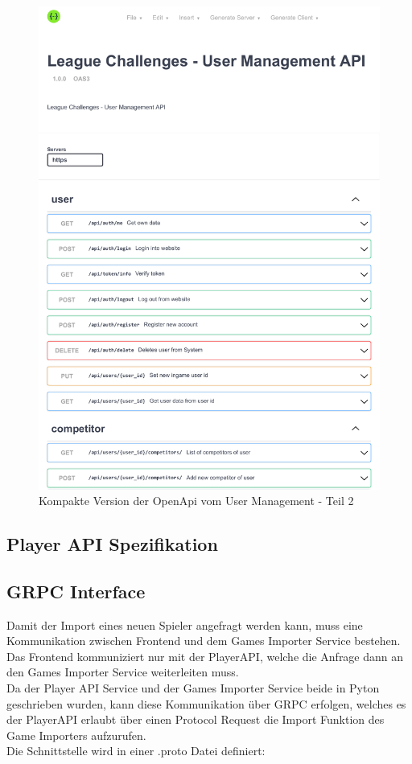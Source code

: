 \begin{figure}
  \centering
  \includegraphics[width=1\textwidth, page=2]{images/pdfs/openapi-short.pdf}
  \caption{Kompakte Version der OpenApi vom User Management - Teil 2}
  \label{fig:compact_user_openapi_2}
\end{figure}

\subsection{Player API Spezifikation}

\subsection{GRPC Interface}
Damit der Import eines neuen Spieler angefragt werden kann, muss eine Kommunikation zwischen Frontend und dem Games Importer Service bestehen. Das Frontend kommuniziert nur mit der PlayerAPI, welche die Anfrage dann an den Games Importer Service weiterleiten muss.\\
Da der Player API Service und der Games Importer Service beide in Pyton geschrieben wurden, kann diese Kommunikation über GRPC erfolgen, welches es der PlayerAPI erlaubt über einen Protocol Request die Import Funktion des Game Importers aufzurufen.\\ %
Die Schnittstelle wird in einer .proto Datei definiert:

